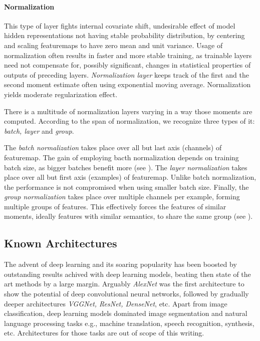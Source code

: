 \paragraph{Normalization}
This type of layer fights internal covariate shift, undesirable effect of model hidden representations not having stable probability distribution, by centering and scaling featuremaps to have zero mean and unit variance. Usage of normalization often results in faster and more stable training, as trainable layers need not compensate for, possibly significant, changes in statistical properties of outputs of preceding layers. \emph{Normalization layer} keeps track of the first and the second moment estimate often using exponential moving average. Normalization yields moderate regularization effect.

There is a multitude of normalization layers varying in a way those moments are computed. According to the span of normalization, we recognize three types of it: \emph{batch, layer} and \emph{group}.

The \emph{batch normalization} takes place over all but last axis (channels) of featuremap. The gain of employing bacth normalization depends on training batch size, as bigger batches benefit more (see \cite{DBLP:journals/corr/IoffeS15}). The \emph{layer normalization} takes place over all but first axis (examples) of featuremap. Unlike batch normalization, the performance is not compromised when using smaller batch size. Finally, the \emph{group normalization} takes place over multiple channels per example, forming multiple groups of features. This effectively forces the features of similar moments, ideally features with similar semantics, to share the same group (see \cite{DBLP:journals/corr/abs-1803-08494}).

\subsection{Known Architectures}
The advent of deep learning and its soaring popularity has been boosted by outstanding results achived with deep learning models, beating then state of the art methods by a large margin. Arguably \emph{AlexNet} was the first architecture to show the potential of deep convolutional neural networks, followed by gradually deeper architectures \emph{VGGNet, ResNet, DenseNet}, etc. Apart from image classification, deep learning models dominated image segmentation and natural language processing tasks e.g., machine translation, speech recognition, synthesis, etc. Architectures for those tasks are out of scope of this writing.

